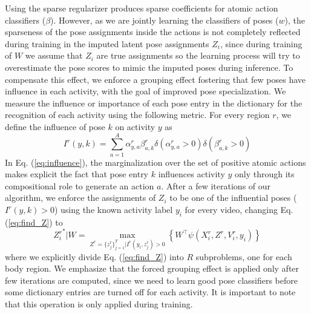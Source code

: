 Using the sparse regularizer produces sparse coefficients for atomic action classifiers ($\beta$). 
However, as we are jointly learning the classifiers of poses ($w$), the sparseness of the pose 
assignments inside the actions is not completely reflected during training in the imputed latent 
pose assignments $Z_i$, since during training of $W$ we assume that $Z_i$ are true assignments so 
the learning process will try to overestimate the pose scores to mimic the imputed poses during 
inference. To compensate this effect, we enforce a grouping effect fostering that few poses have 
influence in each activity, with the goal of improved pose specialization. We measure the influence 
or importance of each pose entry in the dictionary for the recognition
of each activity using the following metric.
For every region $r$, we define the influence of pose $k$ on activity $y$ as
\begin{equation}
\label{eq:influence}
I^r(y,k) = \sum_{a=1}^A \alpha^r_{y,a} \beta^r_{a,k} \delta(\alpha^r_{y,a}>0)\delta(\beta^r_{a,k}>0)
\end{equation}
In Eq. (\ref{eq:influence}), the marginalization over the set of positive atomic actions makes explicit the fact
that pose entry $k$ influences activity $y$ only through its compositional role to generate an 
action $a$. After a few  iterations of our algorithm, we enforce the assignments of $Z_i$ to be one of the influential poses ($I^r(y,k)>0$) using the known activity label $y_i$ for every video, changing Eq. (\ref{eq:find_Z}) to
\begin{equation}
\label{eq:find_Z_with_I}
 {Z_i^r}^* | W= \max_{Z^r =\{z^r_j\}_{j=1}^T | I^r(y_i,z^r_j)>0} \left\{ W^\top\psi(X^r_i,Z^r,V^r_i,y_i) \right \}
\end{equation}
where we explicitly divide Eq. (\ref{eq:find_Z}) into $R$ subproblems, one for each body region. We emphasize that the forced grouping effect is applied only after few iterations are computed, since we need to learn good pose classifiers before some dictionary entries are turned off for each activity. It is important to note that this operation is only applied during training. 

